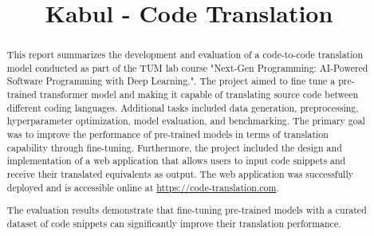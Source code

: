 \documentclass[conference]{IEEEtran}
\begin{document}
\title{Kabul - Code Translation}

\author{
\and
{}
\and
{}
\and
{}
}

\maketitle

\begin{abstract}
This report summarizes the development and evaluation of a code-to-code translation model 
conducted as part of the TUM lab course "Next-Gen Programming: AI-Powered Software Programming with Deep Learning.". 
The project aimed to fine tune a pre-trained transformer model and making it capable of translating source code between different coding languages.
Additional tasks included data generation, preprocessing, hyperparameter optimization, model evaluation, and benchmarking.
The primary goal was to improve the performance of pre-trained models in terms of translation capability through fine-tuning.
Furthermore, the project included the design and implementation of a web application that allows users to input code snippets and receive their translated equivalents as output.
The web application was successfully deployed and is accessible online at \url{https://code-translation.com}.

The evaluation results demonstrate that fine-tuning pre-trained models with a curated dataset of code snippets can significantly improve their translation performance.
\end{abstract}
\end{document}
